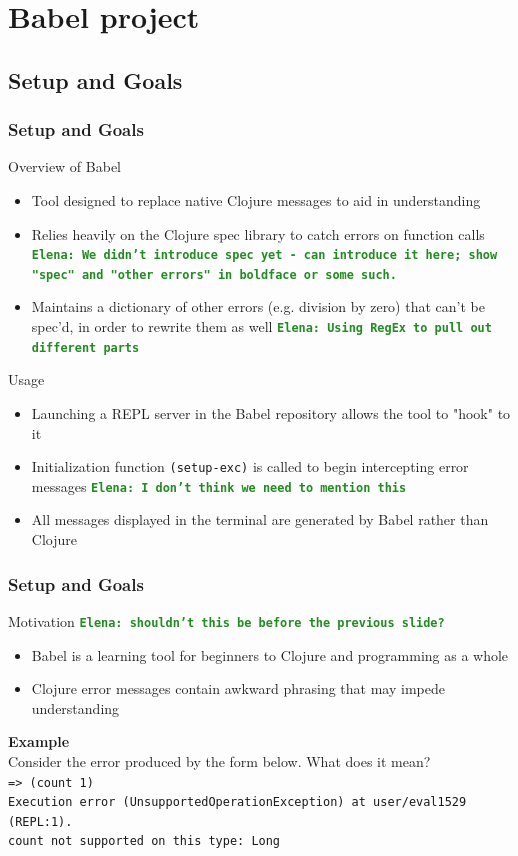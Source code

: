 \documentclass{beamer}
\newcommand{\comment}[1]{{\bf \tt  {#1}}}
\newcommand{\emcomment}[1]{\textcolor{ForestGreen}{\comment{Elena: {#1}}}}
\begin{document}
\section{Babel project}

\subsection{Setup and Goals}
\begin{frame}
    \frametitle{Setup and Goals}
    Overview of Babel
    \begin{itemize}
        \item Tool designed to replace native Clojure messages to aid in understanding
        \item Relies heavily on the Clojure spec library to catch errors on function calls
\emcomment{We didn't introduce spec yet - can introduce it here; show "spec" and "other errors" in boldface or some such.}
        \item Maintains a dictionary of other errors (e.g. division by zero) that can't be spec'd, in order to rewrite them as well 
\emcomment{Using RegEx to pull out different parts}
    \end{itemize}
    Usage
    \begin{itemize}
        \item Launching a REPL server in the Babel repository allows the tool to "hook" to it
        \item Initialization function \texttt{(setup-exc)} is called to begin intercepting error messages
\emcomment{I don't think we need to mention this}
        \item All messages displayed in the terminal are generated by Babel rather than Clojure
    \end{itemize}
\end{frame}

\begin{frame}
    \frametitle{Setup and Goals}
    Motivation
\emcomment{shouldn't this be before the previous slide?}
    \begin{itemize}
        \item Babel is a learning tool for beginners to Clojure and programming as a whole
        \item Clojure error messages contain awkward phrasing that may impede understanding
    \end{itemize}
    \textbf{Example} \\
    Consider the error produced by the form below. What does it mean? \\
    \texttt{=> (count 1)} \\
    \texttt{Execution error (UnsupportedOperationException) at user/eval1529 (REPL:1).} \\
    \texttt{count not supported on this type: Long} \\
\end{frame}
    
\end{document}
